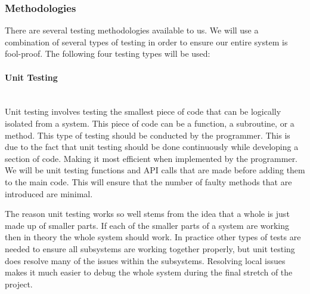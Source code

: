 \subsubsection{Methodologies}
There are several testing methodologies available to us. We will use a combination of several types of testing in order to ensure our entire system is fool-proof. The following four testing types will be used:

\paragraph{Unit Testing} \mbox{}\\[\paragraphheaderspace]
Unit testing involves testing the smallest piece of code that can be logically isolated from a system. This piece of code can be a function, a subroutine, or a method. This type of testing should be conducted by the programmer. This is due to the fact that unit testing should be done continuously while developing a section of code. Making it most efficient when implemented by the programmer. We will be unit testing functions and API calls that are made before adding them to the main code. This will ensure that the number of faulty methods that are introduced are minimal.\par
The reason unit testing works so well stems from the idea that a whole is just made up of smaller parts. If each of the smaller parts of a system are working then in theory the whole system should work. In practice other types of tests are needed to ensure all subsystems are working together properly, but unit testing does resolve many of the issues within the subsystems. Resolving local issues makes it much easier to debug the whole system during the final stretch of the project.

